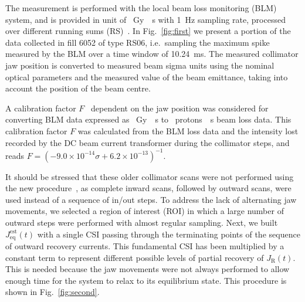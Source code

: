 The measurement is performed with the local beam loss monitoring (BLM) system, and is provided in unit of \SI{}{Gy \per s} with \SI{1}{Hz} sampling rate, processed over different running sums (RS)~\cite{LHCDR}. In Fig.~\ref{fig:first} we present a portion of the data collected in fill 6052 of type RS06, i.e.\ sampling the maximum spike measured by the BLM over a time window of \SI{10.24}{ms}. The measured collimator jaw position is converted to measured beam sigma units using the nominal optical parameters and the measured value of the beam emittance, taking into account the position of the beam centre.

A calibration factor $F$~\cite{arek} dependent on the jaw position was considered for converting BLM data expressed as \SI{}{Gy \per s} to \SI{}{protons \per s} beam loss data. This calibration factor $F$ was calculated from the BLM loss data and the intensity lost recorded by the DC beam current transformer during the collimator steps, and reads $F = \left(-9.0\times10^{-14}\sigma + 6.2\times10^{-13}\right)^{-1}$.

It should be stressed that these older collimator scans were not performed using the new procedure~\cite{our_paper9}, as complete inward scans, followed by outward scans, were used instead of a sequence of in/out steps. To address the lack of alternating jaw movements, we selected a region of interest (ROI) in which a large number of outward steps were performed with almost regular sampling. Next, we built $J_\text{eq}^{\text{est}}(t)$ with a single CSI passing through the terminating points of the sequence of outward recovery currents. This fundamental CSI has been multiplied by a constant term to represent different possible levels of partial recovery of $J_\mathrm{R}(t)$. This is needed because the jaw movements were not always performed to allow enough time for the system to relax to its equilibrium state. This procedure is shown in Fig.~\ref{fig:second}.

